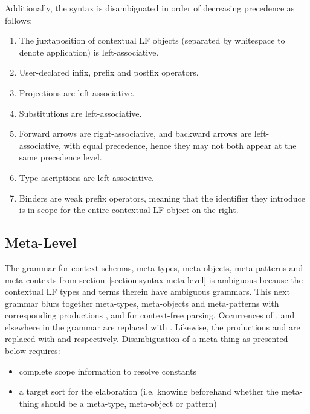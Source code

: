 \documentclass[11pt]{article}
\newcommand{\LF}{\textsc{LF}\xspace}
\begin{document}
Additionally, the syntax is disambiguated in order of decreasing precedence as follows:

\begin{enumerate}
\item The juxtaposition of contextual \LF objects (separated by whitespace to denote application) is left-associative.
\item User-declared infix, prefix and postfix operators.
\item Projections are left-associative.
\item Substitutions are left-associative.
\item Forward arrows are right-associative, and backward arrows are left-associative, with equal precedence, hence they may not both appear at the same precedence level.
\item Type ascriptions are left-associative.
\item Binders are weak prefix operators, meaning that the identifier they introduce is in scope for the entire contextual \LF object on the right.
\end{enumerate}

\subsection{Meta-Level}

The grammar for context schemas, meta-types, meta-objects, meta-patterns and meta-contexts from section~\ref{section:syntax-meta-level} is ambiguous because the contextual \LF types and terms therein have ambiguous grammars.
This next grammar blurs together meta-types, meta-objects and meta-patterns with corresponding productions ,  and  for context-free parsing.
Occurrences of ,  and  elsewhere in the grammar are replaced with .
Likewise, the productions  and  are replaced with  and  respectively.
Disambiguation of a meta-thing as presented below requires:
\begin{itemize}
\item complete scope information to resolve constants
\item a target sort for the elaboration (i.e. knowing beforehand whether the meta-thing should be a meta-type, meta-object or pattern)
\end{itemize}
\end{document}

